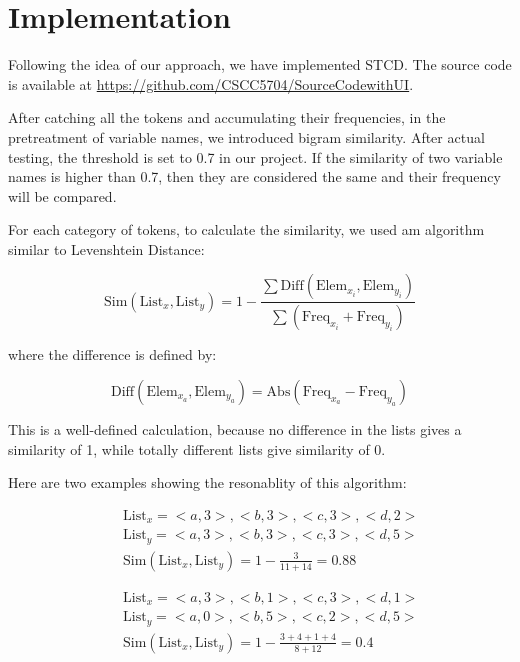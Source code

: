 \documentclass[../main.tex]{subfiles}
\begin{document}
\section{Implementation}

Following the idea of our approach, we have implemented STCD. The source code is available at {\color{blue} \url{https://github.com/CSCC5704/SourceCodewithUI}}.

After catching all the tokens and accumulating their frequencies, in the pretreatment of variable names, we introduced bigram similarity. After actual testing, the threshold is set to 0.7 in our project. If the similarity of two variable names is higher than 0.7, then they are considered the same and their frequency will be compared.

For each category of tokens, to calculate the similarity, we used am algorithm similar to Levenshtein Distance:

\begin{equation}
\text{Sim}(\text{List}_x, \text{List}_y) = 1 - \frac{\sum \text{Diff}(\text{Elem}_{x_i}, \text{Elem}_{y_i})} {\sum (\text{Freq}_{x_i} + \text{Freq}_{y_i} )}
\end{equation}

where the difference is defined by:

\begin{equation}
\text{Diff}(\text{Elem}_{x_a}, \text{Elem}_{y_a}) = \text{Abs}(\text{Freq}_{x_a} - \text{Freq}_{y_a})
\end{equation}

This is a well-defined calculation, because no difference in the lists gives a similarity of 1, while totally different lists give similarity of 0.

Here are two examples showing the resonablity of this algorithm:

\begin{eqnarray}\nonumber
&&\text{List}_x = {<a, 3>, <b, 3>, <c, 3>, <d, 2>}\\ \nonumber
&&\text{List}_y = {<a, 3>, <b, 3>, <c, 3>, <d, 5>} \\ 
&&\text{Sim}(\text{List}_x, \text{List}_y) = 1 - \frac{3}{11 + 14} = 0.88
\end{eqnarray}

\begin{eqnarray}\nonumber
&&\text{List}_x = {<a, 3>, <b, 1>, <c, 3>, <d, 1>}\\ \nonumber
&&\text{List}_y = {<a, 0>, <b, 5>, <c, 2>, <d, 5>} \\ 
&&\text{Sim}(\text{List}_x, \text{List}_y) = 1 - \frac{3 + 4 + 1 + 4}{8 + 12} = 0.4
\end{eqnarray}
\end{document}
